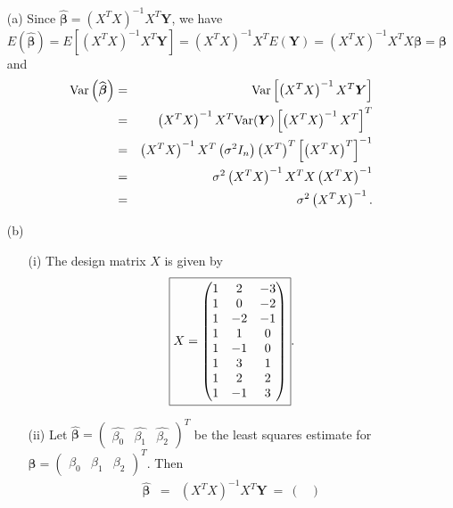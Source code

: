 \documentclass[11pt]{article}
\newcommand{\ds}{\displaystyle}
\newcommand{\bs}{\boldsymbol}
\begin{document}
\vspace{0.5cm}


\begin{enumerate}
\item[(a)]
Since $\ds \widehat{\bs{\beta}} = \left(X^T X\right)^{-1} X^T\bs{Y}$, we have
$$
E\left(\widehat{\bs{\beta}}\right) = E\left[\left(X^T X\right)^{-1} X^T\bs{Y}\right] = \left(X^T X\right)^{-1} X^TE(\bs{Y}) = \left(X^T X\right)^{-1} X^T X\bs{\beta} = \bs{\beta}
$$
and
\begin{eqnarray*}
{\rm Var}\left(\widehat{\bs{\beta}}\right) & = & {\rm Var}\left[\left(X^T X\right)^{-1} X^T\bs{Y}\right] \\
& = & \left(X^T X\right)^{-1} X^T {\rm Var}(\bs{Y})\left[\left(X^T X\right)^{-1} X^T\right]^T \\
& = & \left(X^T X\right)^{-1} X^T \left(\sigma^2 I_n\right) \left(X^T\right)^T \left[\left(X^T X\right)^T\right]^{-1} \\
& = & \sigma^2 \left(X^T X\right)^{-1} X^T X \left(X^T X\right)^{-1} \\
& = & \sigma^2 \left(X^T X\right)^{-1}.
\end{eqnarray*}
\item[(b)]
\begin{enumerate}
\item[(i)]
The design matrix $X$ is given by
$$
\fbox{$\ds X = \begin{pmatrix}
1 & 2 & -3 \\
1 & 0 & -2 \\
1 & -2 & -1 \\
1 & 1 & 0 \\
1 & -1 & 0 \\
1 & 3 & 1 \\
1 & 2 & 2 \\
1 & -1 & 3
\end{pmatrix}$}.
$$
\item[(ii)]
Let $\widehat{\bs{\beta}} = \begin{pmatrix}
\widehat{\beta_0} & \widehat{\beta_1} & \widehat{\beta_2}
\end{pmatrix}^T$ be the least squares estimate for $\bs{\beta} = \begin{pmatrix}
\beta_0 & \beta_1 & \beta_2
\end{pmatrix}^T$. Then
\begin{eqnarray*}
\widehat{\bs{\beta}} & = & \left(X^T X\right)^{-1} X^T{\bs Y} \ = \ \begin{pmatrix}

\end{pmatrix}
\end{eqnarray*}
\end{enumerate}
\end{enumerate}
\end{document}
